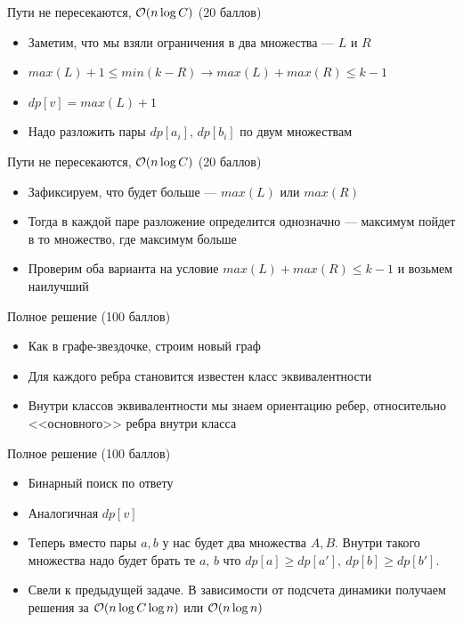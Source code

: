 \begin{frame}{Пути не пересекаются, $\mathcal{O}(n \log C)$ (20 баллов)}
  \begin{itemize}
    \item Заметим, что мы взяли ограничения в два множества --- $L$ и $R$
    \item $max(L) + 1 \le min(k - R) \rightarrow max(L) + max(R) \le k - 1$
    \item $dp[v] = max(L) + 1$
    \item Надо разложить пары $dp[a_i],\,dp[b_i]$ по двум множествам
  \end{itemize}
\end{frame}

\begin{frame}{Пути не пересекаются, $\mathcal{O}(n \log C)$ (20 баллов)}
  \begin{itemize}
    \item Зафиксируем, что будет больше --- $max(L)$ или $max(R)$
    \item Тогда в каждой паре разложение определится однозначно --- максимум пойдет в то множество, где максимум больше
    \item Проверим оба варианта на условие $max(L) + max(R) \le k - 1$ и возьмем наилучший
  \end{itemize}
\end{frame}

\begin{frame}{Полное решение (100 баллов)}
  \begin{itemize}
    \item Как в графе-звездочке, строим новый граф
    \item Для каждого ребра становится известен класс эквивалентности
    \item Внутри классов эквивалентности мы знаем ориентацию ребер, относительно <<основного>> ребра внутри класса
  \end{itemize}
\end{frame}

\begin{frame}{Полное решение (100 баллов)}
  \begin{itemize}
    \item Бинарный поиск по ответу
    \item Аналогичная $dp[v]$
    \item Теперь вместо пары $a, b$ у нас будет два множества $A, B$. Внутри такого множества надо будет брать те $a,\,b$ что $dp[a] \ge dp[a'],\ dp[b] \ge dp[b']$.
    \item Свели к предыдущей задаче. В зависимости от подсчета динамики получаем решения за $\mathcal{O}(n \log C \log n)$ или $\mathcal{O}(n \log n)$
  \end{itemize}
\end{frame}
